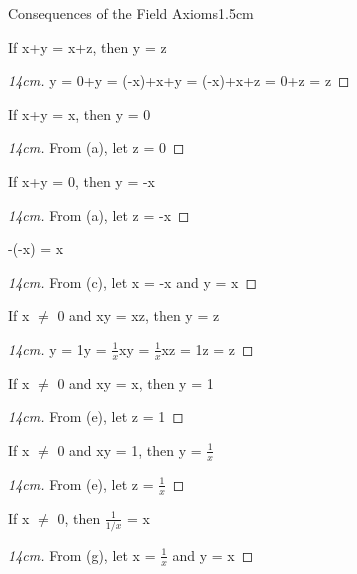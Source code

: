 	\begin{ltheorem}{Consequences of the Field Axioms}{1.5cm}
		\item If x+y = x+z, then y = z
		
			\begin{proof}[14cm]
				y = 0+y = (-x)+x+y = (-x)+x+z = 0+z = z
			\end{proof}
	
		\item If x+y = x, then y = 0

			\begin{proof}[14cm]
				From (a), let z = 0
			\end{proof}
	
		\item If x+y = 0, then y = -x
		
			\begin{proof}[14cm]
				From (a), let z = -x
			\end{proof}
	
		\item -(-x) = x
		
			\begin{proof}[14cm]
				From (c), let x = -x and y = x
			\end{proof}
	
		\item If x $\not =$ 0 and xy = xz, then y = z
			
			\begin{proof}[14cm]
				y = 1y = $\frac{1}{x}$xy = $\frac{1}{x}$xz = 1z = z
			\end{proof}
	
		\item If x $\not =$ 0 and xy = x, then y = 1
		
			\begin{proof}[14cm]
				From (e), let z = 1
			\end{proof}
	
		\item If x $\not =$ 0 and xy = 1, then y = $\frac{1}{x}$
		
			\begin{proof}[14cm]
				From (e), let z = $\frac{1}{x}$
			\end{proof}

			\newpage
	
		\item If x $\not =$ 0, then $\frac{1}{1/x}$ = x
		
			\begin{proof}[14cm]
				From (g), let x = $\frac{1}{x}$ and y = x
			\end{proof}
	

\end{ltheorem}
